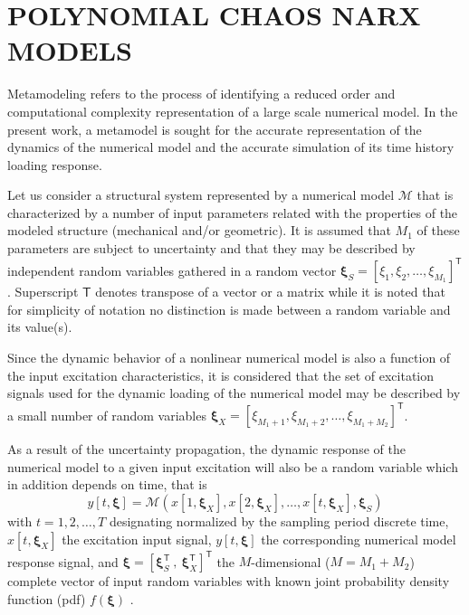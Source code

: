 \documentclass[12pt,a4paper,twocolumn,fleqn]{narms}
\newcommand{\bld}[1]{\boldsymbol{#1}}
\newcommand{\bxi}{\bld{\xi}}
\newcommand{\beq}{\begin{equation}}
\newcommand{\eeq}{\end{equation}}
\begin{document}
\section{POLYNOMIAL CHAOS NARX MODELS}
\label{sec:PCNARX}

Metamodeling refers to the process of identifying a reduced order and computational complexity representation of a large scale numerical model. In the present work, a metamodel is sought for the accurate representation of the dynamics of the numerical model and the accurate simulation of its time history loading response.

Let us consider a structural system represented by a numerical model $\mathcal M$ that is characterized by a number of input parameters related with the properties of the modeled structure (mechanical and/or geometric). It is assumed that $M_1$ of these parameters are subject to uncertainty and that they may be described by independent random variables gathered in a random vector $\bxi_S = [ \xi_{1}, \xi_{2},\ldots ,\xi_{M_1} ]^{\mathsf T}$. Superscript $\mathsf T$ denotes transpose of a vector or a matrix while it is noted that for simplicity of notation no distinction is made between a random variable and its value(s).


Since the dynamic behavior of a nonlinear numerical model is also a function of the input excitation characteristics, it is considered that the set of excitation signals used for the dynamic loading of the numerical model may be described by a small number of random variables $\bxi_X = [ \xi_{M_1+1}, \xi_{M_1+2},\ldots ,\xi_{M_1+M_2} ]^{\mathsf T}$. 

As a result of the uncertainty propagation, the dynamic response of the numerical model to a given input excitation will also be a random variable which in addition depends on time, that is
\beq 
y[t,\bxi] = {\mathcal M}(x[1,\bxi_X],x[2,\bxi_X],\ldots,x[t,\bxi_X],\bxi_S)
\eeq
with $t = 1,2,\ldots, T $ designating normalized by the sampling period discrete time, $x[t,\bxi_X]$ the excitation input signal, $y[t,\bxi]$ the corresponding numerical model response signal, and $\bxi = [ \bxi_S^\mathsf{T} \ ,\ \bxi_X^\mathsf{T} ]^\mathsf{T}$ the $M$-dimensional ($M = M_1 + M_2$) complete vector of input random variables with known joint probability density function (pdf) $f(\bxi)$ . 
\end{document}
